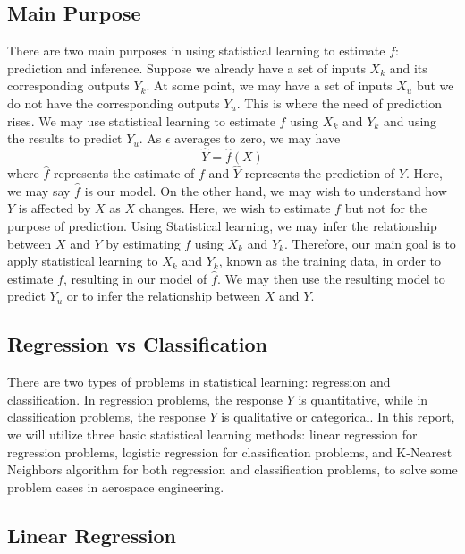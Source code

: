 \documentclass[conf]{new-aiaa}
\begin{document}
\subsection{Main Purpose}
There are two main purposes in using statistical learning to estimate $f$: prediction and inference. Suppose we already have a set of inputs $X_k$ and its corresponding outputs $Y_k$. At some point, we may have a set of inputs $X_u$ but we do not have the corresponding outputs $Y_u$. This is where the need of prediction rises. We may use statistical learning to estimate $f$ using $X_k$ and $Y_k$ and using the results to predict $Y_u$. As $\epsilon$ averages to zero, we may have
\begin{equation} \label{eq:statslearnpred}
    \hat{Y} = \hat{f}(X)
\end{equation}
where $\hat{f}$ represents the estimate of $f$ and $\hat{Y}$ represents the prediction of $Y$. Here, we may say $\hat{f}$ is our model. On the other hand, we may wish to understand how $Y$ is affected by $X$ as $X$ changes. Here, we wish to estimate $f$ but not for the purpose of prediction. Using Statistical learning, we may infer the relationship between $X$ and $Y$ by estimating $f$ using $X_k$ and $Y_k$. Therefore, our main goal is to apply statistical learning to $X_k$ and $Y_k$, known as the training data, in order to estimate $f$, resulting in our model of $\hat{f}$. We may then use the resulting model to predict $Y_u$ or to infer the relationship between $X$ and $Y$.

\subsection{Regression vs Classification}
There are two types of problems in statistical learning: regression and classification. In regression problems, the response $Y$ is quantitative, while in classification problems, the response $Y$ is qualitative or categorical. In this report, we will utilize three basic statistical learning methods: linear regression for regression problems, logistic regression for classification problems, and K-Nearest Neighbors algorithm for both regression and classification problems, to solve some problem cases in aerospace engineering.

\subsection{Linear Regression}
\end{document}
